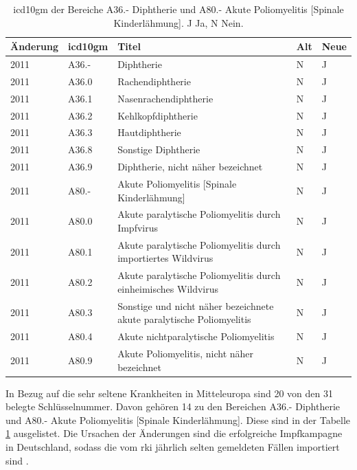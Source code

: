 \begin{table}[ht]
	\centering
	\caption[Diphtherie und Poliomyelitis]{\ac{icd10gm} der Bereiche \textsf{A36.-} \textsf{Diphtherie} und \textsf{A80.-} \textsf{Akute Poliomyelitis [Spinale Kinderlähmung]}. \textsf{J} Ja, \textsf{N} Nein.}
	\label{tab:icdeuropa}
	\begin{tabular}{|l|l|p{8cm}|l|l|}
		\hline
		\rowcolor{lightgray} Änderung & \ac{icd10gm} & Titel & Alt & Neue \\ \hline
		2011 & A36.- & Diphtherie & N & J \\ \hline
		2011 & A36.0 & Rachendiphtherie & N & J \\ \hline
		2011 & A36.1 & Nasenrachendiphtherie & N & J \\ \hline
		2011 & A36.2 & Kehlkopfdiphtherie & N & J \\ \hline
		2011 & A36.3 & Hautdiphtherie & N & J \\ \hline
		2011 & A36.8 & Sonstige Diphtherie & N & J \\ \hline
		2011 & A36.9 & Diphtherie, nicht näher bezeichnet & N & J \\ \hline
		2011 & A80.- & Akute Poliomyelitis [Spinale Kinderlähmung] & N & J \\ \hline
		2011 & A80.0 & Akute paralytische Poliomyelitis durch Impfvirus & N & J \\ \hline
		2011 & A80.1 & Akute paralytische Poliomyelitis durch importiertes Wildvirus & N & J \\ \hline
		2011 & A80.2 & Akute paralytische Poliomyelitis durch einheimisches Wildvirus & N & J \\ \hline
		2011 & A80.3 & Sonstige und nicht näher bezeichnete akute paralytische Poliomyelitis & N & J \\ \hline
		2011 & A80.4 & Akute nichtparalytische Poliomyelitis & N & J \\ \hline
		2011 & A80.9 & Akute Poliomyelitis, nicht näher bezeichnet & N & J \\ \hline
	\end{tabular}
\end{table}


In Bezug auf die sehr seltene Krankheiten in Mitteleuropa sind \textsf{20} von den \textsf{31} belegte Schlüsselnummer. Davon gehören \textsf{14} zu den Bereichen \textsf{A36.-} \textsf{Diphtherie} und \textsf{A80.-} \textsf{Akute Poliomyelitis [Spinale Kinderlähmung]}. Diese sind in der Tabelle \ref{tab:icdeuropa} ausgelistet. Die Ursachen der Änderungen sind die erfolgreiche Impfkampagne in Deutschland, sodass die vom \ac{rki} jährlich selten gemeldeten Fällen importiert sind \cite{dippol1}.

